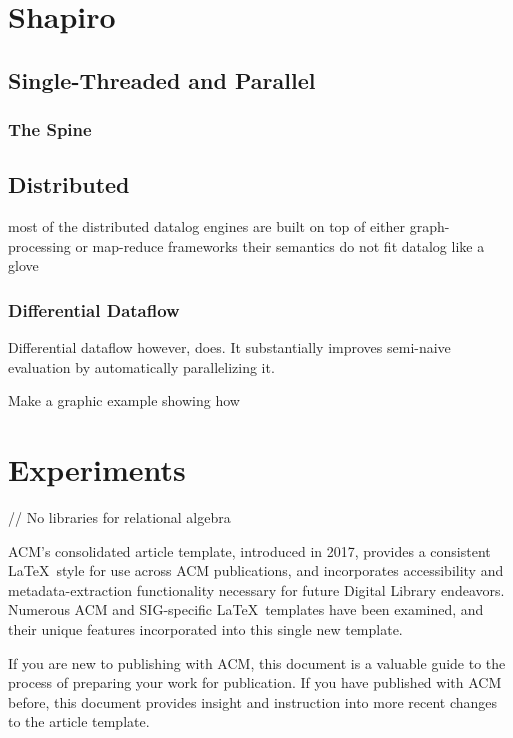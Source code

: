 \documentclass[manuscript,screen,review]{acmart}
\theoremstyle{definition}
\begin{document}
\section{Shapiro}

\subsection{Single-Threaded and Parallel}

\subsubsection{The Spine}

\subsection{Distributed}

most of the distributed datalog engines are built on top of either graph-processing or map-reduce frameworks
their semantics do not fit datalog like a glove

\subsubsection{Differential Dataflow}

Differential dataflow however, does. It substantially improves semi-naive evaluation by automatically parallelizing it.

Make a graphic example showing how

\section{Experiments}

// No libraries for relational algebra


ACM's consolidated article template, introduced in 2017, provides a
consistent \LaTeX\ style for use across ACM publications, and
incorporates accessibility and metadata-extraction functionality
necessary for future Digital Library endeavors. Numerous ACM and
SIG-specific \LaTeX\ templates have been examined, and their unique
features incorporated into this single new template.

If you are new to publishing with ACM, this document is a valuable
guide to the process of preparing your work for publication. If you
have published with ACM before, this document provides insight and
instruction into more recent changes to the article template.
\end{document}

